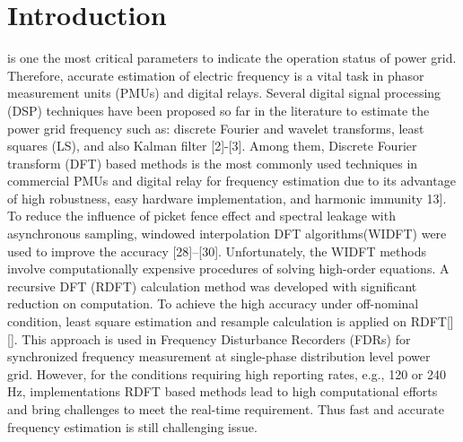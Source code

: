 \documentclass[journal,twoside]{IEEEtran}
\begin{document}
\section{Introduction}
% 
% 
% 
% 

 is one the most critical parameters to indicate the operation status of  power grid. Therefore, accurate  estimation of electric frequency is a vital task in phasor measurement units (PMUs) and digital relays. Several digital signal processing (DSP) techniques have been proposed so far in the literature to estimate the power grid frequency such as: discrete Fourier and wavelet transforms, least squares (LS), and also Kalman filter [2]-[3].
Among them, Discrete Fourier transform (DFT) based methods is the most commonly
used techniques in commercial PMUs  and digital relay for frequency estimation due to its advantage of high robustness, easy hardware implementation, and harmonic immunity 13]. To reduce the influence of picket fence effect and spectral leakage with asynchronous
sampling, windowed interpolation DFT algorithms(WIDFT) were used to improve the  accuracy [28]–[30].
Unfortunately, the WIDFT methods involve computationally expensive procedures of solving high-order equations.
A recursive DFT (RDFT) calculation method was developed with significant reduction on computation. To achieve the high accuracy under  off-nominal condition, least square estimation and resample calculation is applied on RDFT[][]. This approach is used in  Frequency Disturbance
Recorders (FDRs) for synchronized frequency measurement at single-phase distribution level power grid. However, for the conditions requiring high
reporting rates, e.g., 120 or 240 Hz, implementations RDFT based methods
lead to high computational efforts and bring challenges
to meet the real-time requirement. Thus fast and accurate frequency estimation is still challenging issue. 
\end{document}
